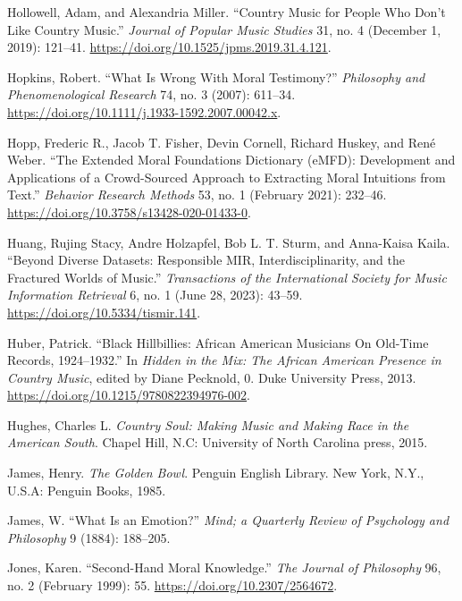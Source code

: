 \documentclass[
  12pt,
]{book}
\newlength{\cslhangindent}
\newenvironment{CSLReferences}[2] %
 {\begin{list}{}{%
  \setlength{\itemindent}{0pt}
  \setlength{\leftmargin}{0pt}
  \setlength{\parsep}{0pt}
  \ifodd #1
   \setlength{\leftmargin}{\cslhangindent}
   \setlength{\itemindent}{-1\cslhangindent}
  \fi
  \setlength{\itemsep}{#2\baselineskip}}}
 {\end{list}}
\theoremstyle{definition}
\theoremstyle{definition}
\theoremstyle{definition}
\theoremstyle{definition}
\theoremstyle{remark}
\begin{document}
\begin{CSLReferences}{1}{0}
Hollowell, Adam, and Alexandria Miller. {``Country {Music} for {People Who Don}'t {Like Country Music}.''} \emph{Journal of Popular Music Studies} 31, no. 4 (December 1, 2019): 121--41. \url{https://doi.org/10.1525/jpms.2019.31.4.121}.

Hopkins, Robert. {``What {Is Wrong With Moral Testimony}?''} \emph{Philosophy and Phenomenological Research} 74, no. 3 (2007): 611--34. \url{https://doi.org/10.1111/j.1933-1592.2007.00042.x}.

Hopp, Frederic R., Jacob T. Fisher, Devin Cornell, Richard Huskey, and René Weber. {``The Extended {Moral Foundations Dictionary} ({eMFD}): {Development} and Applications of a Crowd-Sourced Approach to Extracting Moral Intuitions from Text.''} \emph{Behavior Research Methods} 53, no. 1 (February 2021): 232--46. \url{https://doi.org/10.3758/s13428-020-01433-0}.

Huang, Rujing Stacy, Andre Holzapfel, Bob L. T. Sturm, and Anna-Kaisa Kaila. {``Beyond {Diverse Datasets}: {Responsible MIR}, {Interdisciplinarity}, and the {Fractured Worlds} of {Music}.''} \emph{Transactions of the International Society for Music Information Retrieval} 6, no. 1 (June 28, 2023): 43--59. \url{https://doi.org/10.5334/tismir.141}.

Huber, Patrick. {``Black {Hillbillies}: {African American Musicians On Old-Time Records}, 1924--1932.''} In \emph{Hidden in the {Mix}: {The African American Presence} in {Country Music}}, edited by Diane Pecknold, 0. Duke University Press, 2013. \url{https://doi.org/10.1215/9780822394976-002}.

Hughes, Charles L. \emph{Country Soul: Making Music and Making Race in the {American South}}. Chapel Hill, N.C: University of North Carolina press, 2015.

James, Henry. \emph{The Golden Bowl}. Penguin {English} Library. New York, N.Y., U.S.A: Penguin Books, 1985.

James, W. {``What Is an Emotion?''} \emph{Mind; a Quarterly Review of Psychology and Philosophy} 9 (1884): 188--205.

Jones, Karen. {``Second-{Hand Moral Knowledge}.''} \emph{The Journal of Philosophy} 96, no. 2 (February 1999): 55. \url{https://doi.org/10.2307/2564672}.


\end{CSLReferences}
\end{document}
